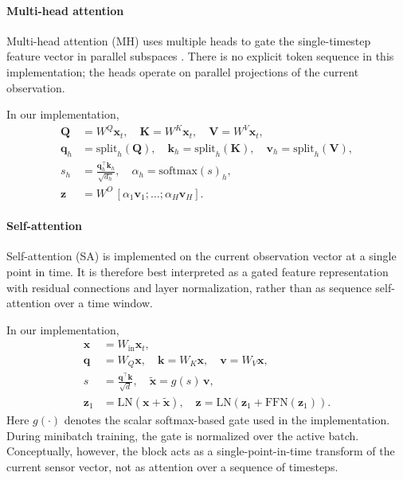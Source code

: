 \documentclass[sn-vancouver-num]{sn-jnl}%
\begin{document}
\paragraph{Multi-head attention}
Multi-head attention (MH) uses multiple heads to gate the single-timestep feature vector in parallel subspaces \cite{Vaswani2017}. There is no explicit token sequence in this implementation; the heads operate on parallel projections of the current observation.

In our implementation,
\begin{align}
        \mathbf{Q}&=W^Q\mathbf{x}_t,\quad \mathbf{K}=W^K\mathbf{x}_t,\quad \mathbf{V}=W^V\mathbf{x}_t,\\
        \mathbf{q}_h&=\mathrm{split}_h(\mathbf{Q}),\quad \mathbf{k}_h=\mathrm{split}_h(\mathbf{K}),\quad \mathbf{v}_h=\mathrm{split}_h(\mathbf{V}),\\
        s_h&=\frac{\mathbf{q}_h^\top\mathbf{k}_h}{\sqrt{d_h}},\quad \alpha_h=\mathrm{softmax}(s)_h,\\
        \mathbf{z}&=W^O\,[\alpha_1\mathbf{v}_1;\ldots;\alpha_H\mathbf{v}_H].
\end{align}

\paragraph{Self-attention}
Self-attention (SA) is implemented on the current observation vector at a single point in time. It is therefore best interpreted as a gated feature representation with residual connections and layer normalization, rather than as sequence self-attention over a time window.

In our implementation,
\begin{align}
        \mathbf{x} &= W_{\mathrm{in}}\mathbf{x}_t,\\
        \mathbf{q} &= W_Q\mathbf{x},\quad \mathbf{k}=W_K\mathbf{x},\quad \mathbf{v}=W_V\mathbf{x},\\
        s &= \frac{\mathbf{q}^\top\mathbf{k}}{\sqrt{d}},\quad \tilde{\mathbf{x}} = g(s)\,\mathbf{v},\\
        \mathbf{z}_1 &= \mathrm{LN}\!\left(\mathbf{x}+\tilde{\mathbf{x}}\right),\quad
        \mathbf{z}=\mathrm{LN}\!\left(\mathbf{z}_1+\mathrm{FFN}(\mathbf{z}_1)\right).
\end{align}
Here $g(\cdot)$ denotes the scalar softmax-based gate used in the implementation. During minibatch training, the gate is normalized over the active batch. Conceptually, however, the block acts as a single-point-in-time transform of the current sensor vector, not as attention over a sequence of timesteps.
\end{document}
